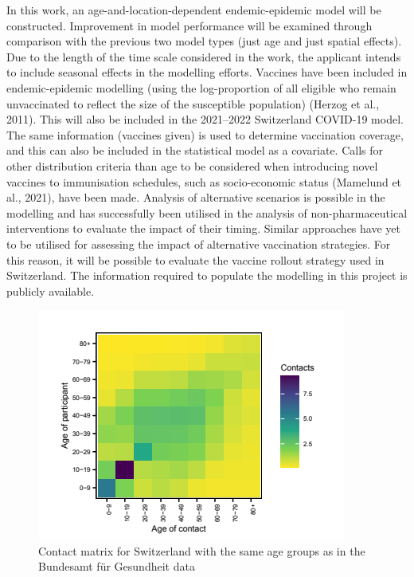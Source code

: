 \documentclass[authordate, rga]{jote-new-article}
\begin{document}
In this work, an age-and-location-dependent endemic-epidemic model will be constructed. Improvement in model performance will be examined through comparison with the previous two model types (just age and just spatial effects). Due to the length of the time scale considered in the work, the applicant intends to include seasonal effects in the modelling efforts. Vaccines have been included in endemic-epidemic modelling (using the log-proportion of all eligible who remain unvaccinated to reflect the size of the susceptible population) (Herzog et al., 2011). This will also be included in the 2021--2022 Switzerland COVID-19 model. The same information (vaccines given) is used to determine vaccination coverage, and this can also be included in the statistical model as a covariate. Calls for other distribution criteria than age to be considered when introducing novel vaccines to immunisation schedules, such as socio-economic status (Mamelund et al., 2021), have been made. Analysis of alternative scenarios is possible in the modelling and has successfully been utilised in the analysis of non-pharmaceutical interventions to evaluate the impact of their timing. Similar approaches have yet to be utilised for assessing the impact of alternative vaccination strategies. For this reason, it will be possible to evaluate the vaccine rollout strategy used in Switzerland. The information required to populate the modelling in this project is publicly available.








\begin{figure}[t!]
  \begin{fullwidth}
    \centering
    \includegraphics[width=.6\linewidth]{media/image3.png}

    \caption{Contact matrix for Switzerland with the same age groups as in the Bundesamt für Gesundheit data}

    \label{fig:rId7}
  \end{fullwidth}


\end{figure}
\end{document}
